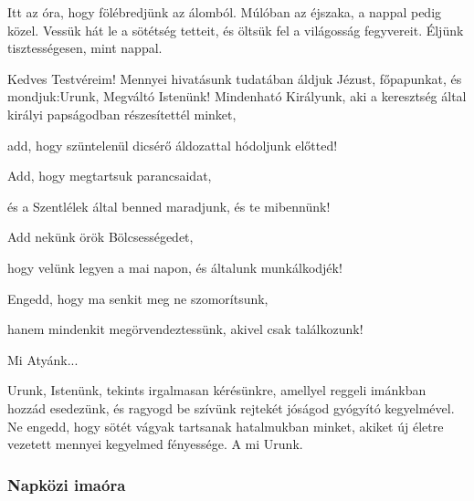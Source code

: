 \documentclass[twoside]{article}
\begin{document}
Itt az óra, hogy fölébredjünk az álomból. Múlóban az éjszaka, a nappal pedig közel. Vessük hát le a sötétség tetteit, és öltsük fel a világosság fegyvereit. Éljünk tisztességesen, mint nappal.



\begin{preces}{Kedves Testvéreim! Mennyei hivatásunk tudatában áldjuk Jézust, főpapunkat, és mondjuk:}{Urunk, Megváltó Istenünk!}
  Mindenható Királyunk, aki a keresztség által királyi papságodban részesítettél minket,

  \reddash add, hogy szüntelenül dicsérő áldozattal hódoljunk előtted!

  Add, hogy megtartsuk parancsaidat,

  \reddash és a Szentlélek által benned maradjunk, és te mibennünk!

  Add nekünk örök Bölcsességedet,

  \reddash hogy velünk legyen a mai napon, és általunk munkálkodjék!

  Engedd, hogy ma senkit meg ne szomorítsunk,

  \reddash hanem mindenkit megörvendeztessünk, akivel csak találkozunk!
\end{preces}
Mi Atyánk...

Urunk, Istenünk, tekints irgalmasan kérésünkre, amellyel reggeli imánkban hozzád esedezünk, és ragyogd be szívünk rejtekét jóságod gyógyító kegyelmével. Ne engedd, hogy sötét vágyak tartsanak hatalmukban minket, akiket új életre vezetett mennyei kegyelmed fényessége. A mi Urunk.

\subsubsection*{Napközi imaóra}
\end{document}
